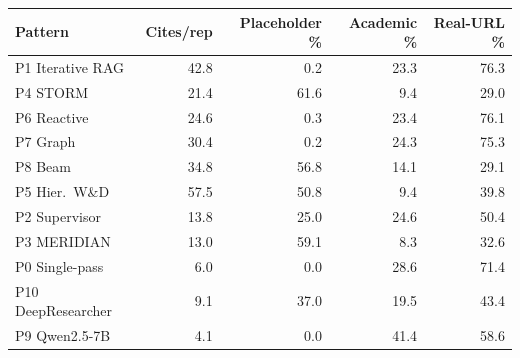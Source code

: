 \begin{tabular}{lrrrr}
\toprule
Pattern & Cites/rep & Placeholder \% & Academic \% & Real-URL \%\\
\midrule
P1 Iterative RAG & 42.8 & 0.2 & 23.3 & 76.3 \\
P4 STORM & 21.4 & 61.6 & 9.4 & 29.0 \\
P6 Reactive & 24.6 & 0.3 & 23.4 & 76.1 \\
P7 Graph & 30.4 & 0.2 & 24.3 & 75.3 \\
P8 Beam & 34.8 & 56.8 & 14.1 & 29.1 \\
P5 Hier.\ W\&D & 57.5 & 50.8 & 9.4 & 39.8 \\
P2 Supervisor & 13.8 & 25.0 & 24.6 & 50.4 \\
P3 MERIDIAN & 13.0 & 59.1 & 8.3 & 32.6 \\
P0 Single-pass & 6.0 & 0.0 & 28.6 & 71.4 \\
P10 DeepResearcher & 9.1 & 37.0 & 19.5 & 43.4 \\
P9 Qwen2.5-7B & 4.1 & 0.0 & 41.4 & 58.6 \\
\bottomrule
\end{tabular}